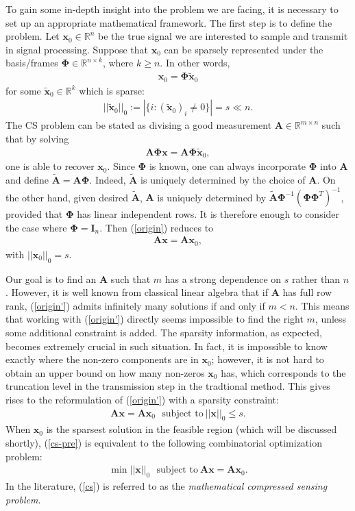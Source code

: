 \documentclass[11pt]{article}
\numberwithin{equation}{section}
\theoremstyle{plain}
\theoremstyle{definition}
\def\R{{\mathbb R}}
\def\R{{\mathbb R}}
\def\A{{\mathbf A}}
\def\x{{\mathbf x}}
\def\Ph{{\mathbf {\Phi}}}
\begin{document}
To gain some in-depth insight into the problem we are facing, it is necessary to set up an appropriate mathematical framework. The first step is to define the problem. Let $\x_0\in\R^n$ be the true signal we are interested to sample and transmit in signal processing. Suppose that $\x_0$ can be sparsely represented under the basis/frames $\Ph\in\R^{n\times k}$, where $k\geq n$. In other words,
\begin{align*}
\x_0 = \Ph\tilde{\x}_0
\end{align*} 
for some $\tilde{\x}_0\in\R^k$ which is sparse:
\begin{align*}
||\tilde{\x}_0||_0:=\left|\{i:  (\tilde{\x}_0)_i\neq 0\}\right|=s\ll n.
\end{align*}
The CS problem can be stated as divising a good measurement $\A\in\R^{m\times n}$ such that by solving 
\begin{align}
\A\Ph\x = \A\Ph\tilde{\x}_0,\label{origin}
\end{align}    
one is able to recover $\x_0$. Since $\Ph$ is known, one can always incorporate $\Ph$ into $\A$ and define $\tilde{\A}=\A\Ph$. Indeed, $\tilde{\A}$ is uniquely determined by the choice of $\A$. On the other hand, given desired $\tilde{\A}$, $\A$ is uniquely determined by $\tilde{\A}\Ph^{-1}(\Ph\Ph^T)^{-1}$, provided that $\Ph$ has linear independent rows. It is therefore enough to consider the case where $\Ph=\mathbf{I}_n$. Then (\ref{origin}) reduces to
\begin{align}
\A\x = \A\x_0,\label{origin'}
\end{align} 
with $||\x_0||_0=s$. 

Our goal is to find an $\A$ such that $m$ has a strong dependence on $s$ rather than $n$. However, it is well known from classical linear algebra that if $\A$ has full row rank, (\ref{origin'}) admits infinitely many solutions if and only if $m<n$. This means that working with (\ref{origin'}) directly seems impossible to find the right $m$, unless some additional constraint is added. The sparsity information, as expected, becomes extremely crucial in such situation. In fact, it is impossible to know exactly where the non-zero components are in $\x_0$; however, it is not hard to obtain an upper bound on how many non-zeros $\x_0$ has, which corresponds to the truncation level in the transmission step in the tradtional method. This gives rises to the reformulation of (\ref{origin'}) with a sparsity constraint:  
\begin{align}
\A\x = \A\x_0 \ \ \ \text{subject to}\ ||\x||_0\leq s.\label{cs-pre}
\end{align} 
When $\x_0$ is the sparsest solution in the feasible region (which will be discussed shortly), (\ref{cs-pre}) is equivalent to the following combinatorial optimization problem:
\begin{align}
\min ||\x||_0 \ \ \ \text{subject to}\ \A\x=\A\x_0.\label{cs}
\end{align} 
In the literature, (\ref{cs}) is referred to as the \emph{mathematical compressed sensing problem}. 
\end{document}
